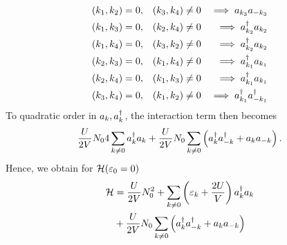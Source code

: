 \begin{align*}
	(k_1, k_2) = 0, && (k_3, k_4)\ne 0 &&\implies a_{k_3}a_{-k_3} \\
	(k_1, k_3) = 0, && (k_2, k_4)\ne 0 &&\implies a_{k_2}^{\dagger}a_{k_2} \\
	(k_1, k_4) = 0, && (k_3, k_2)\ne 0 &&\implies a_{k_2}^{\dagger}a_{k_2} \\
	(k_2, k_3) = 0, && (k_1, k_4)\ne 0 &&\implies a_{k_1}^{\dagger}a_{k_1} \\
	(k_2, k_4) = 0, && (k_1, k_3)\ne 0 &&\implies a_{k_1}^{\dagger}a_{k_1} \\
	(k_3, k_4) = 0, && (k_1, k_2)\ne 0 &&\implies a_{k_1}^{\dagger}a_{-k_1}^{\dagger} \\
\end{align*}
To quadratic order in $a_k, a_k^{\dagger}$, the interaction term then becomes
\begin{equation}
	\frac{U}{2V}N_04\sum_{k\ne0}a_{k}^{\dagger}a_{k} + \frac{U}{2V}N_0\sum_{k\ne0}\left (a_{k}^{\dagger}a_{-k}^{\dagger} + a_{k}a_{-k}\right ).
\end{equation}
Hence, we obtain for $\mathcal{H} (\varepsilon_0 = 0)$
\begin{equation}
	\begin{aligned}
		\mathcal{H} &=\frac{U}{2V}N_0^2 + \sum_{k\ne0}\left (\varepsilon_k + \frac{2U}{V}\right )a_{k}^{\dagger}a_{k} \\
		&+ \frac{U}{2V}N_0 \sum_{k\ne0}\left (a_{k}^{\dagger}a_{-k}^{\dagger} + a_{k}a_{-k}\right )
	\end{aligned}
\end{equation}

